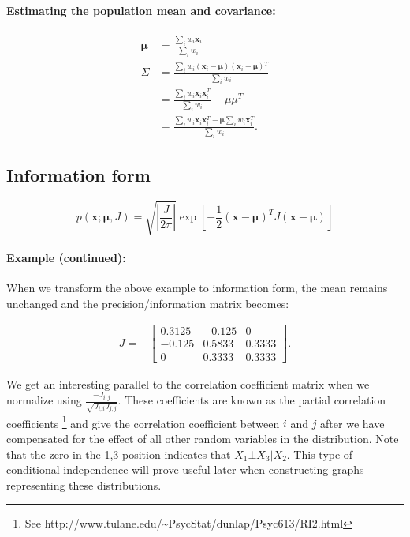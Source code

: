 \paragraph{Estimating the population mean and covariance:}

\begin{align*}
\mathbf{\mu} & =\frac{\sum_{i}w_{i}\mathbf{x}_{i}}{\sum_{i}w_{i}}\\
\Sigma & =\frac{\sum_{i}w_{i}(\mathbf{x}_{i}-\mathbf{\mu})(\mathbf{x}_{i}-\mathbf{\mu}){}^{T}}{\sum_{i}w_{i}}\\
 & =\frac{\sum_{i}w_{i}\mathbf{x}_{i}\mathbf{x}_{i}^{T}}{\sum_{i}w_{i}}-\mu\mu^{T}\\
 & =\frac{\sum_{i}w_{i}\mathbf{x}_{i}\mathbf{x}_{i}^{T}-\mathbf{\mu}\sum_{i}w_{i}\mathbf{x}_{i}^{T}}{\sum_{i}w_{i}}.
\end{align*}



\subsection{Information form}

\begin{equation}
p(\mathbf{x;\mathbf{\mu},}J)=\sqrt{\left|\frac{J}{2\pi}\right|}\exp\left[-\frac{1}{2}(\mathbf{x}-\mathbf{\mu})^{T}J(\mathbf{x}-\mathbf{\mu})\right]
\end{equation}



\paragraph{Example (continued):}

When we transform the above example to information form, the mean
remains unchanged and the precision/information matrix becomes:

\begin{align*}
J= & \left[\begin{array}{rrr}
0.3125 & -0.125 & 0\\
-0.125 & 0.5833 & 0.3333\\
0 & 0.3333 & 0.3333
\end{array}\right].
\end{align*}


We get an interesting parallel to the correlation coefficient matrix
when we normalize using $\frac{-J_{i,j}}{\sqrt{J_{i,i}J_{j,j}}}$.
These coefficients are known as the partial correlation coefficients%
\footnote{See http://www.tulane.edu/\textasciitilde{}PsycStat/dunlap/Psyc613/RI2.html%
} and give the correlation coefficient between $i$ and $j$ after
we have compensated for the effect of all other random variables in
the distribution. Note that the zero in the 1,3 position indicates
that $X_{1}\bot X_{3}|X_{2}$. This type of conditional independence
will prove useful later when constructing graphs representing these
distributions.


